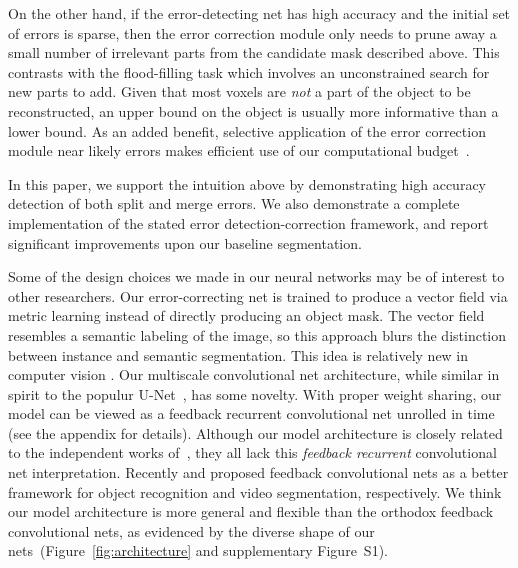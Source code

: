 \documentclass{article}
\begin{document}
On the other hand, if the error-detecting net has high accuracy and the initial set of errors is sparse, then the error correction module only needs to prune away a small number of irrelevant parts from the candidate mask described above. This contrasts with the flood-filling task which involves an unconstrained search for new parts to add. Given that most voxels are \textit{not} a part of the object to be reconstructed, an upper bound on the object is usually more informative than a lower bound. As an added benefit, selective application of the error correction module near likely errors makes efficient use of our computational budget~\cite{multipass}.

In this paper, we support the intuition above by demonstrating high accuracy detection of both split and merge errors. We also demonstrate a complete implementation of the stated error detection-correction framework, and report significant improvements upon our baseline segmentation.


Some of the design choices we made in our neural networks may be of interest to
other researchers. Our error-correcting net is trained to produce a vector field
via metric learning instead of directly producing an object mask. The vector
field resembles a semantic labeling of the image, so this approach blurs the
distinction between instance and semantic segmentation. This idea is relatively
new in computer vision
\cite{harley2015metric,fathi2017metric,brabandere2017metric}. Our multiscale
convolutional net architecture, while similar in spirit to the populur
U-Net~\cite{unet}, has some novelty. With proper weight sharing, our model can
be viewed as a feedback recurrent convolutional net unrolled in time (see the
appendix for details). Although our model architecture is closely related to the
independent works of~\cite{neuralfabric,mdnet,gridnet}, they all lack this
\emph{feedback recurrent} convolutional net interpretation. Recently
\cite{pavel2017recurrent} and \cite{spoerer2017recurrent} proposed feedback
convolutional nets as a better framework for object recognition and video
segmentation, respectively. We think our model architecture is more general and
flexible than the orthodox feedback convolutional nets, as evidenced by the
diverse shape of our nets~(Figure~\ref{fig:architecture} and supplementary
Figure~S1).
\end{document}
